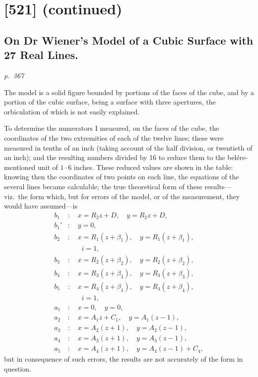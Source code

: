\documentclass[11pt,a4paper]{book}
\begin{document}
\section*{[521] (continued)}
\subsection*{On Dr Wiener's Model of a Cubic Surface with 27 Real Lines.}

\textit{p.~367}

\noindent
The model is a solid figure bounded by portions of the faces of the cube, and
by a portion of the cubic surface, being a surface with three apertures, the orbiculation
of which is not easily explained.

To determine the numerators I measured, on the faces of the cube, the coordinates
of the two extremities of each of the twelve lines; these were measured in tenths
of an inch (taking account of the half division, or twentieth of an inch); and the
resulting numbers divided by 16 to reduce them to the bel\'ere-mentioned unit of $1\cdot 6$
inches.  These reduced values are shown in the table: knowing then the coordinates
of two points on each line, the equations of the several lines became calculable; the
true theoretical form of these results---viz.\ the form which, but for errors of the
model, or of the measurement, they would have assumed---is
\begin{align*}
b_1 &: \quad x = R_2 z + D, \quad y = R_2 z + D, \\
b_1' &: \quad y = 0, \\
b_2 &: \quad x = R_1 (z + \beta_1), \quad y = R_1 (z + \beta_1), \\
&\qquad i = 1, \\
b_3 &: \quad x = R_2 (z + \beta_2), \quad y = R_2 (z + \beta_2), \\
b_4 &: \quad x = R_3 (z + \beta_3), \quad y = R_3 (z + \beta_3), \\
b_5 &: \quad x = R_4 (z + \beta_4), \quad y = R_4 (z + \beta_4), \\
&\qquad i = 1, \\
a_1 &: \quad x = 0, \quad y = 0, \\
a_2 &: \quad x = A_1 z + C_1, \quad y = A_1 (z - 1), \\
a_3 &: \quad x = A_2 (z + 1), \quad y = A_2 (z - 1), \\
a_4 &: \quad x = A_3 (z + 1), \quad y = A_3 (z - 1), \\
a_5 &: \quad x = A_4 (z + 1), \quad y = A_4 (z - 1) + C_4,
\end{align*}
but in consequence of such errors, the results are not accurately of the form in question.
\end{document}
